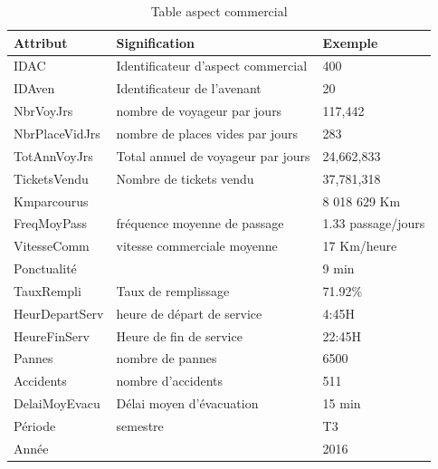 \documentclass[a4paper]{report}
\begin{document}
\begin{doublespace}
	\begin{table}[H]
		\begin{center}
			\begin{tabularx}{17.5cm}{|X|X|X|}
				\hline
				\textbf{Attribut} & \textbf{Signification}               &
				\textbf{Exemple}                                                        \\
				\hline
				IDAC              & Identificateur d’aspect commercial & 400          \\
				\hline
				IDAven            & Identificateur de l'avenant          & 20           \\
				\hline
				NbrVoyJrs         & nombre de voyageur par jours         & 117,442      \\
				\hline
				NbrPlaceVidJrs    & nombre de places vides par jours     &
				283                                                                     \\
				\hline
				TotAnnVoyJrs      & Total annuel de voyageur par jours   &
				24,662,833                                                              \\
				\hline
				TicketsVendu      & Nombre de tickets vendu             & 37,781,318   \\
				\hline
				Kmparcourus       &                                      & 8 018 629 Km \\
				\hline
				FreqMoyPass       & fréquence moyenne de passage         & 1.33
				passage/jours                                                           \\
				\hline
				VitesseComm       & vitesse commerciale moyenne          & 17
				Km/heure                                                                \\
				\hline
				Ponctualité       &                                      & 9 min        \\
				\hline
				TauxRempli        & Taux de remplissage                  & 71.92\%      \\
				\hline
				HeurDepartServ    & heure de départ de service           & 4:45H        \\
				\hline
				HeureFinServ      & Heure de fin de service              & 22:45H       \\
				\hline
				Pannes            & nombre de pannes                     & 6500         \\
				\hline
				Accidents         & nombre d'accidents                   & 511          \\
				\hline
				DelaiMoyEvacu     & Délai moyen d'évacuation             & 15 min       \\
				\hline
				Période           & semestre                             & T3           \\
				\hline
				Année             &                                      & 2016         \\
				\hline
			\end{tabularx}
			\caption{Table aspect commercial}
		\end{center}
	\end{table}


\end{doublespace}
\end{document}
